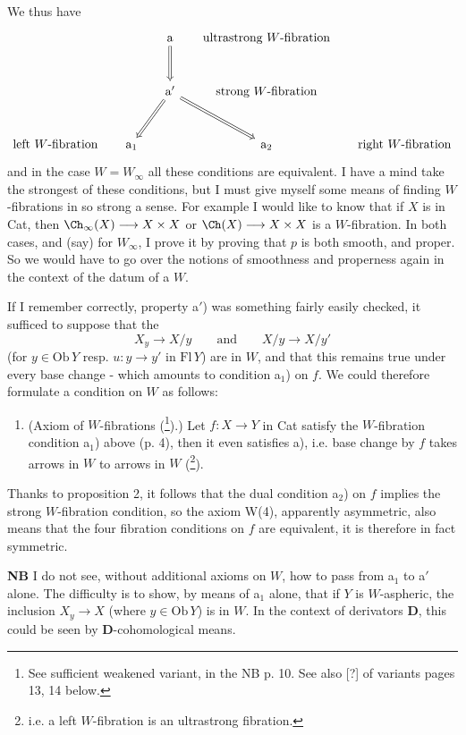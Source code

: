 We thus have
\[
\begin{tikzcd}[row sep=large, column sep=1.4em]
 & & \mathrm{a} \arrow[d, Rightarrow] & \text{ultrastrong $W$-fibration} & \\
 & & \mathrm{a}' \arrow[dl, Rightarrow] \arrow[dr, Rightarrow] & \text{strong $W$-fibration} & \\
\text{left $W$-fibration} & \mathrm{a}_1 & & \mathrm{a}_2 & \text{right $W$-fibration}
\end{tikzcd}
\]
and in the case $W = W_\infty$ all these conditions are equivalent. I have a mind take the strongest of these conditions, but I must give myself some means of finding $W$-fibrations in so strong a sense. For example I would like to know that if $X$
is in Cat, then $\Ch_\infty(X) \longrightarrow X \times X$ or $\Ch(X) \longrightarrow X \times X$ is a $W$-fibration. In both cases, and (say) for $W_\infty$, I prove it by proving that $p$ is both smooth, and proper. So we would have to go over the notions of smoothness and properness again in the context of the datum of a $W$.

If I remember correctly, property a$'$) was something fairly easily checked, it sufficed to suppose that the
\[ X_y \longrightarrow X/y \qquad \text{and} \qquad X/y \longrightarrow X/y' \]
(for $y \in \mathrm{Ob}\,Y$ resp. $u : y \longrightarrow y'$ in $\mathrm{Fl}\,Y$) are in $W$, and that this remains true under every base change - which amounts to condition a$_1$) on $f$. We could therefore formulate a condition on $W$ as follows:

\begin{enumerate}[leftmargin=*]
\item[\textbf{W(4)}] (Axiom of $W$-fibrations (\footnote[6]{See sufficient weakened variant, in the NB p. 10. See also [?] of variants pages 13, 14 below.}).) Let $f : X \longrightarrow Y$ in Cat satisfy the $W$-fibration condition a$_1$) above (p. 4), then it even satisfies a), i.e. base change by $f$ takes arrows in $W$ to arrows in $W$ (\footnote[7]{i.e. a left $W$-fibration is an ultrastrong fibration.}).
\end{enumerate}

Thanks to proposition 2, it follows that the dual condition a$_2$) on $f$ implies the strong $W$-fibration condition, so the axiom W(4), apparently asymmetric, also means that the four fibration conditions on $f$ are equivalent, it is therefore in fact symmetric.

\textbf{NB} I do not see, without additional axioms on $W$, how to pass from a$_1$ to a$'$ alone. The difficulty is to show, by means of a$_1$ alone, that if $Y$ is $W$-aspheric, the inclusion $X_y \longrightarrow X$ (where $y \in \mathrm{Ob}\,Y$) is in $W$. In the context of derivators \textbf{D}, this could be seen by \textbf{D}-cohomological means.

